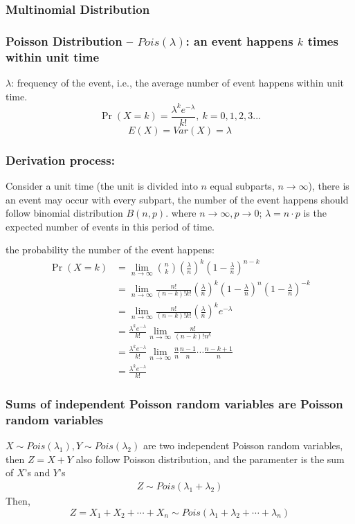 \documentclass[11pt,a4paper]{article}
\begin{document}
\subsubsection{Multinomial Distribution}

\subsubsection{Poisson Distribution -- $Pois(\lambda)$: an event happens $k$ times within unit time}
$\lambda$: frequency of the event, i.e., the average number of event happens within unit time.
$$\Pr(X{=}k)= \frac{\lambda^k e^{-\lambda}}{k!},\ k=0,1,2,3...$$
$$E(X)=Var(X)=\lambda$$

\subsubsection*{Derivation process:}
Consider a unit time (the unit is divided into $n$ equal subparts, $n \rightarrow \infty$), there is an event may occur with every subpart, the number of the event happens should follow binomial distribution $B(n,p)$. where $n \rightarrow \infty, p \rightarrow 0$; $\lambda=n\cdot p$ is the expected number of events in this period of time.

the probability the number of the event happens:
\begin{equation}
    \begin{aligned}
        \Pr(X=k)&=\lim_{n \rightarrow\infty} \binom{n}{k} (\frac{\lambda}{n})^k(1-\frac{\lambda}{n})^{n-k}\\
        &=\lim_{n \rightarrow\infty} \frac{n!}{(n-k)!k!} (\frac{\lambda}{n})^k(1-\frac{\lambda}{n})^{n}(1-\frac{\lambda}{n})^{-k}\\
        &=\lim_{n \rightarrow\infty}\frac{n!}{(n-k)!k!} (\frac{\lambda}{n})^k e^{-\lambda}\\
        &=\frac{\lambda^k e^{-\lambda}}{k!}\lim_{n \rightarrow\infty}\frac{n!}{(n-k)!n^k}\\
        &=\frac{\lambda^k e^{-\lambda}}{k!}\lim_{n \rightarrow\infty}
        \frac{n}{n}\frac{n-1}{n}\cdots \frac{n-k+1}{n}\\
        &=\frac{\lambda^k e^{-\lambda}}{k!}
    \end{aligned}
    \nonumber
\end{equation}

\subsubsection*{Sums of independent Poisson random variables are Poisson random variables}
$X\sim Pois(\lambda_1), Y\sim Pois(\lambda_2)$ are two independent Poisson random variables, then $Z=X+Y$ also follow Poisson distribution, and the paramenter is the sum of $X$'s and $Y$'s
\begin{equation}
    \begin{aligned}
        Z\sim Pois(\lambda_1+\lambda_2)
    \end{aligned}
    \nonumber
\end{equation}
Then, $$Z=X_1+X_2+\cdots+X_n\sim Pois(\lambda_1+\lambda_2+\cdots+\lambda_n)$$
\end{document}
